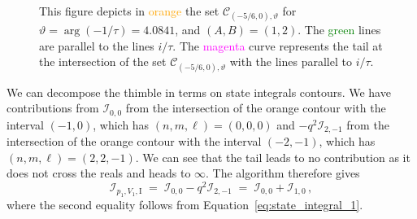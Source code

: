 \documentclass[12pt,reqno]{amsart}
\theoremstyle{definition}
\def\calI{\mathcal I}
\def\calC{\mathcal C}
\def\be{\begin{equation}}
\def\ee{\end{equation}}
\renewcommand{\=}{\;=\;}
\begin{document}
\begin{figure}[ht]
\begin{tiny}
\begin{tikzpicture}[scale=2]
\end{tikzpicture}
\end{tiny}
\caption{This figure depicts in \textcolor{orange}{orange} the set $\calC_{(-5/6,0),\vartheta}$ for $\vartheta=\arg(-1/\tau)=4.0841$, and $(A,B)=(1,2)$. The \textcolor{green}{green} lines are parallel to the lines $i/\tau$. The \textcolor{magenta}{magenta} curve represents the tail at the intersection of the set $\calC_{(-5/6,0),\vartheta}$ with the lines parallel to $i/\tau$.}
\label{fig:thimb.41.I}
\end{figure}
We can decompose the thimble in terms on state integrals contours. We have contributions from $\calI_{0,0}$ from the intersection of the orange contour with the interval $(-1,0)$, which has $(n,m,\ell)=(0,0,0)$ and $-q^2\calI_{2,-1}$ from the intersection of the orange contour with the interval $(-2,-1)$, which has $(n,m,\ell)=(2,2,-1)$. We can see that the tail leads to no contribution as it does not cross the reals and heads to $\infty$. The algorithm therefore gives
\be\label{eq:I1.41}
\calI_{p_1,V_1,\mathrm{I}}
\=
\calI_{0,0}-q^2\calI_{2,-1}
\=
\calI_{0,0}+\calI_{1,0}\,,
\ee
where the second equality follows from Equation~\eqref{eq:state_integral_1}.
\end{document}
